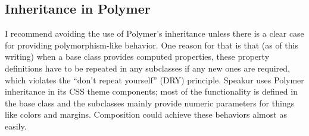 \subsection{Inheritance in Polymer}
I recommend avoiding the use of Polymer's inheritance unless there is a clear case for providing polymorphism-like behavior.
One reason for that is that (as of this writing) when a base class provides computed properties, 
these property definitions have to be repeated in any subclasses if any new ones are required,
which violates the ``don't repeat yourself'' (DRY) principle.
Speakur uses Polymer inheritance in its CSS theme components; 
most of the functionality is defined in the base class and the subclasses mainly provide numeric parameters for things like colors and margins.
Composition could achieve these behaviors almost as easily.


